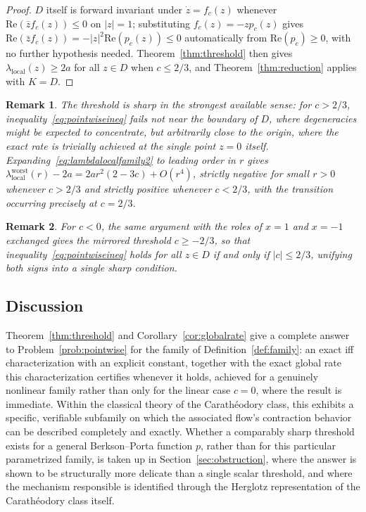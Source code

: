 \documentclass[pdflatex,sn-mathphys-num]{sn-jnl}%
\theoremstyle{thmstyleone}%
\theoremstyle{thmstyletwo}%
\newtheorem{remark}{Remark}%
\theoremstyle{thmstylethree}%
\begin{document}
\begin{proof}
$D$ itself is forward invariant under $\dot z=f_c(z)$ whenever $\mathrm{Re}(\bar zf_c(z))\le0$ on $|z|=1$; substituting $f_c(z)=-zp_c(z)$ gives $\mathrm{Re}(\bar zf_c(z))=-|z|^2\mathrm{Re}(p_c(z))\le0$ automatically from $\mathrm{Re}(p_c)\ge0$, with no further hypothesis needed. Theorem~\ref{thm:threshold} then gives $\lambda_{\mathrm{local}}(z)\ge2a$ for all $z\in D$ when $c\le2/3$, and Theorem~\ref{thm:reduction} applies with $K=D$.
\end{proof}

\begin{remark}
\label{rem:sharpness}
The threshold is sharp in the strongest available sense: for $c>2/3$, inequality~\eqref{eq:pointwiseineq} fails not near the boundary of $D$, where degeneracies might be expected to concentrate, but arbitrarily close to the origin, where the exact rate is trivially achieved at the single point $z=0$ itself. Expanding~\eqref{eq:lambdalocalfamily2} to leading order in $r$ gives $\lambda_{\mathrm{local}}^{\mathrm{worst}}(r)-2a=2ar^2(2-3c)+O(r^4)$, strictly negative for small $r>0$ whenever $c>2/3$ and strictly positive whenever $c<2/3$, with the transition occurring precisely at $c=2/3$.
\end{remark}

\begin{remark}
\label{rem:symmetry}
For $c<0$, the same argument with the roles of $x=1$ and $x=-1$ exchanged gives the mirrored threshold $c\ge-2/3$, so that inequality~\eqref{eq:pointwiseineq} holds for all $z\in D$ if and only if $|c|\le2/3$, unifying both signs into a single sharp condition.
\end{remark}

\subsection{Discussion}

Theorem~\ref{thm:threshold} and Corollary~\ref{cor:globalrate} give a complete answer to Problem~\ref{prob:pointwise} for the family of Definition~\ref{def:family}: an exact iff characterization with an explicit constant, together with the exact global rate this characterization certifies whenever it holds, achieved for a genuinely nonlinear family rather than only for the linear case $c=0$, where the result is immediate. Within the classical theory of the Carath\'eodory class, this exhibits a specific, verifiable subfamily on which the associated flow's contraction behavior can be described completely and exactly. Whether a comparably sharp threshold exists for a general Berkson--Porta function $p$, rather than for this particular parametrized family, is taken up in Section~\ref{sec:obstruction}, where the answer is shown to be structurally more delicate than a single scalar threshold, and where the mechanism responsible is identified through the Herglotz representation of the Carath\'eodory class itself.
\end{document}
